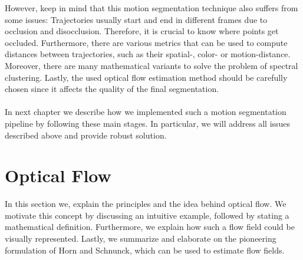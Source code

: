 However, keep in mind that this motion segmentation technique also suffers from some issues: Trajectories usually start and end in different frames due to occlusion and disocclusion. Therefore, it is crucial to know where points get occluded. Furthermore, there are various metrics that can be used to compute distances between trajectories, such as their spatial-, color- or motion-distance. Moreover, there are many mathematical variants to solve the problem of spectral clustering. Lastly, the used optical flow estimation method should be carefully chosen since it affects the quality of the final segmentation. \\ \\
In next chapter we describe how we implemented such a motion segmentation pipeline by following these main stages. In particular, we will address all issues described above and provide robust solution.

\section{Optical Flow}
\label{sec:optical_flow}
In this section we, explain the principles and the idea behind optical flow. We motivate this concept by discussing an intuitive example, followed by stating a mathematical definition. Furthermore, we explain how such a flow field could be visually represented. Lastly, we summarize and elaborate on the pioneering formulation of Horn and Schnunck, which can be used to estimate flow fields.

